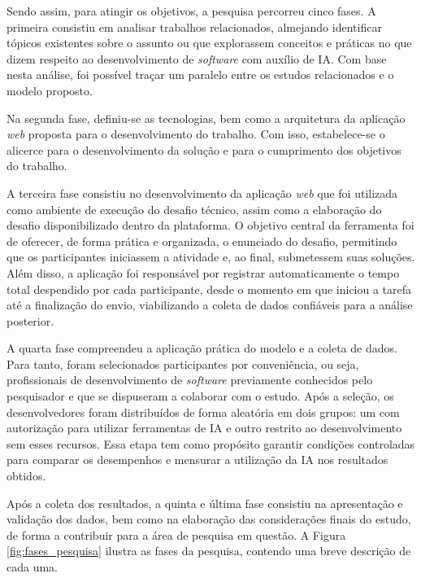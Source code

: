 \documentclass[english,brazilian]{UNISINOSartigo} %
\begin{document}
Sendo assim, para atingir os objetivos, a pesquisa percorreu cinco fases. A primeira consistiu em analisar trabalhos relacionados, almejando identificar tópicos existentes sobre o assunto ou que explorassem conceitos e práticas no que dizem respeito ao desenvolvimento de \textit{software} com auxílio de IA. Com base nesta análise, foi possível traçar um paralelo entre os estudos relacionados e o modelo proposto.

Na segunda fase, definiu-se as tecnologias, bem como a arquitetura da aplicação \textit{web} proposta para o desenvolvimento do trabalho. Com isso, estabelece-se o alicerce para o desenvolvimento da solução e para o cumprimento dos objetivos do trabalho.

A terceira fase consistiu no desenvolvimento da aplicação \textit{web} que foi utilizada como ambiente de execução do desafio técnico, assim como a elaboração do desafio disponibilizado dentro da plataforma. O objetivo central da ferramenta foi de oferecer, de forma prática e organizada, o enunciado do desafio, permitindo que os participantes iniciassem a atividade e, ao final, submetessem suas soluções. Além disso, a aplicação foi responsável por registrar automaticamente o tempo total despendido por cada participante, desde o momento em que iniciou a tarefa até a finalização do envio, viabilizando a coleta de dados confiáveis para a análise posterior.

A quarta fase compreendeu a aplicação prática do modelo e a coleta de dados. Para tanto, foram selecionados participantes por conveniência, ou seja, profissionais de desenvolvimento de \textit{software} previamente conhecidos pelo pesquisador e que se dispuseram a colaborar com o estudo. Após a seleção, os desenvolvedores foram distribuídos de forma aleatória em dois grupos: um com autorização para utilizar ferramentas de IA e outro restrito ao desenvolvimento sem esses recursos. Essa etapa tem como propósito garantir condições controladas para comparar os desempenhos e mensurar a utilização da IA nos resultados obtidos.

Após a coleta dos resultados, a quinta e última fase consistiu na apresentação e validação dos dados, bem como na elaboração das considerações finais do estudo, de forma a contribuir para a área de pesquisa em questão. A Figura \ref{fig:fases_pesquisa} ilustra as fases da pesquisa, contendo uma breve descrição de cada uma.
\end{document}

